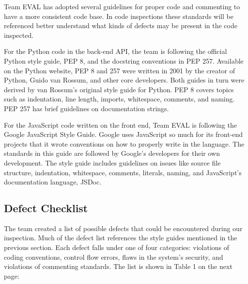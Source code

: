 \documentclass{article}
\begin{document}
Team EVAL has adopted several guidelines for proper code and commenting to have a more consistent code base. In code inspections these standards will be referenced better understand what kinds of defects may be present in the code inspected.

For the Python code in the back-end API, the team is following the official Python style guide, PEP 8, and the docstring conventions in PEP 257. Available on the Python website, PEP 8 and 257 were written in 2001 by the creator of Python, Guido van Rossum, and other core developers. Both guides in turn were derived by van Rossum's original style guide for Python. PEP 8 covers topics such as indentation, line length, imports, whitespace, comments, and naming. PEP 257 has brief guidelines on documentation strings.

For the JavaScript code written on the front end, Team EVAL is following the Google JavaScript Style Guide. Google uses JavaScript so much for its front-end projects that it wrote conventions on how to properly write in the language. The standards in this guide are followed by Google's developers for their own development. The style guide includes guidelines on issues like source file structure, indentation, whitespace, comments, literals, naming, and JavaScript's documentation language, JSDoc. 

\subsection{Defect Checklist}

The team created a list of possible defects that could be encountered during our inspection. Much of the defect list references the style guides mentioned in the previous section. Each defect falls under one of four categories: violations of coding conventions, control flow errors, flaws in the system's security, and violations of commenting standards. The list is shown in Table 1 on the next page:

\vspace{0.5cm}
\end{document}
